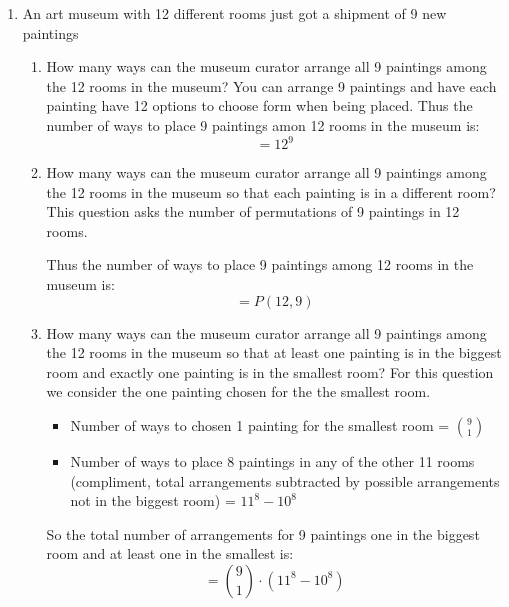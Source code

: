 \documentclass{article}
\begin{document}
\begin{enumerate}
    \item An art museum with 12 different rooms just got a shipment of 9 new paintings
    \begin{enumerate}
      \item How many ways can the museum curator arrange all 9 paintings among the 12 rooms
      in the museum?
      You can arrange 9 paintings and have each painting have 12 options to choose form when being placed.
      Thus the number of ways to place 9 paintings amon 12 rooms in the museum is:
      \[
         = 12^{9}
      \]

      \item How many ways can the museum curator arrange all 9 paintings among the 12 rooms
      in the museum so that each painting is in a different room?
      This question asks the number of permutations of 9 paintings in 12 rooms.
     
      Thus the number of ways to place 9 paintings among 12 rooms in the museum is:
      \[
         = P(12,9)
      \] 

      \item How many ways can the museum curator arrange all 9 paintings among the 12 rooms
      in the museum so that at least one painting is in the biggest room and exactly one painting is in
      the smallest room?
      For this question we consider the one painting chosen for the the smallest room.
      \begin{itemize}
        \item Number of ways to chosen 1 painting for the smallest room = $ \binom{9}{1} $
        \item Number of ways to place 8 paintings in any of the other 11 rooms (compliment, total arrangements subtracted by possible arrangements not in the biggest room) = $11^8 - 10^8$ 
      \end{itemize}
      So the total number of arrangements for 9 paintings one in the biggest room and at least one in the smallest is:
      \[
        =  \binom{9}{1} \cdot (11^8 - 10^8)
      \]


\end{enumerate}
\end{enumerate}
\end{document}
